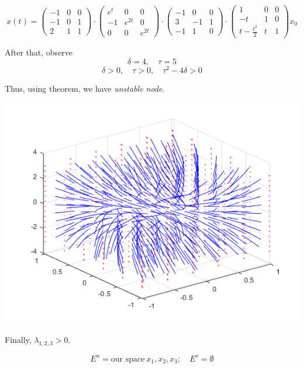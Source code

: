 \documentclass[12pt]{article}
\begin{document}
    $$
        x(t)=
        \begin{pmatrix}
            -1 & 0 & 0\\
            -1 & 0 & 1\\
             2 & 1 & 1
        \end{pmatrix}\cdot
        \begin{pmatrix}
            e^{t} & 0 & 0\\
            -1 & e^{2t} & 0\\
            0 & 0 & e^{2t}
        \end{pmatrix}\cdot
        \begin{pmatrix}
            -1 &  0 & 0\\
             3 & -1 & 1\\
            -1 &  1 & 0
        \end{pmatrix}\cdot
        \begin{pmatrix}
            1 &  0 & 0\\
            -t & 1 & 0\\
            t-\frac{t^2}{2} &  t & 1
        \end{pmatrix}
        x_0
    $$

    After that, observe
    $$
        \delta = 4,\quad\tau = 5
    $$
    $$
        \delta>0,\quad\tau > 0,\quad
        \tau^2-4\delta>0
    $$

    Thus, using theorem, we have \textit{unstable node}.
    \begin{center}
        \includegraphics[scale=0.7]{plot5.png}
    \end{center}

    Finally,
    $\lambda_{1,2,3}>0$.

    $$
        E^u = \text{our space}\:x_1,x_2,x_3;
        \quad
        E^s=\emptyset
    $$
    
\end{document}
